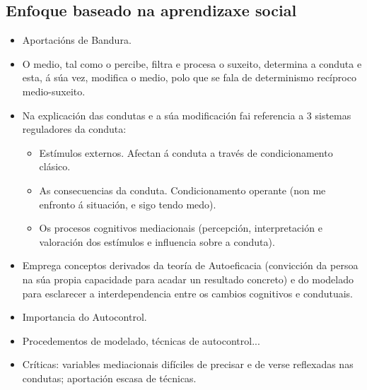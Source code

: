 \documentclass[a4paper,11pt]{article}
\begin{document}
\subsection{Enfoque baseado na aprendizaxe social}
\begin{itemize}
	\item Aportacións de Bandura.
	\item O medio, tal como o percibe, filtra e procesa o suxeito, determina a conduta e esta, á súa 
	vez, modifica o medio, polo que se fala de determinismo recíproco medio-suxeito.
	\item Na explicación das condutas e a súa modificación fai referencia a 3 sistemas reguladores da 
	conduta:
	\begin{itemize}
		\item Estímulos externos. Afectan á conduta a través de condicionamento clásico.
		\item As consecuencias da conduta. Condicionamento operante (non me enfronto á situación, e 
		sigo tendo medo).
		\item Os procesos cognitivos mediacionais (percepción, interpretación e valoración dos 
		estímulos e influencia sobre a conduta).
	\end{itemize}
	\item Emprega conceptos derivados da teoría de Autoeficacia (convicción da persoa na súa propia 
	capacidade para acadar un resultado concreto) e do modelado para esclarecer a interdependencia 
	entre os cambios cognitivos e condutuais.
	\item Importancia do Autocontrol.
	\item Procedementos de modelado, técnicas de autocontrol...
	\item Críticas: variables mediacionais difíciles de precisar e de verse reflexadas nas condutas; 
	aportación escasa de técnicas.
\end{itemize}
\end{document}
